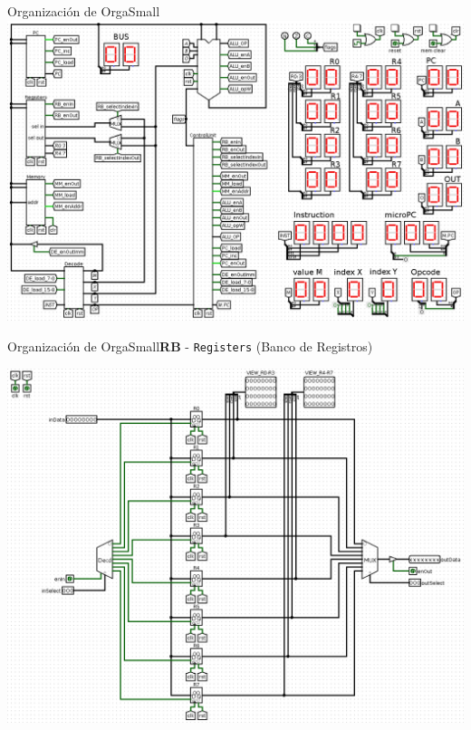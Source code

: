 \documentclass[aspectratio=169]{beamer}
\begin{document}
\begin{frame}[fragile,t]{Organización de OrgaSmall}
\includegraphics[scale=0.27]{img/0_dataPath.png}
\end{frame}

\begin{frame}[fragile,t]{Organización de OrgaSmall}{\textbf{RB} - \texttt{Registers} (Banco de Registros)}
    \begin{center} \includegraphics[scale=0.22]{img/1_registers.png} \end{center}
\end{frame}
\end{document}
